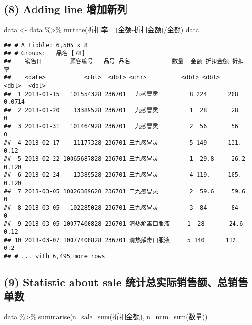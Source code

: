 \documentclass[
]{article}
\newenvironment{Shaded}{\begin{snugshade}}{\end{snugshade}}
\newcommand{\AttributeTok}[1]{\textcolor[rgb]{0.77,0.63,0.00}{#1}}
\newcommand{\FunctionTok}[1]{\textcolor[rgb]{0.00,0.00,0.00}{#1}}
\newcommand{\NormalTok}[1]{#1}
\newcommand{\OtherTok}[1]{\textcolor[rgb]{0.56,0.35,0.01}{#1}}
\newcommand{\SpecialCharTok}[1]{\textcolor[rgb]{0.00,0.00,0.00}{#1}}
\begin{document}
\hypertarget{adding-line-ux589eux52a0ux65b0ux5217}{%
\subsection{(8) Adding line
增加新列}\label{adding-line-ux589eux52a0ux65b0ux5217}}

\begin{Shaded}
\begin{Highlighting}[]
\NormalTok{data }\OtherTok{\textless{}{-}}\NormalTok{ data }\SpecialCharTok{\%\textgreater{}\%} \FunctionTok{mutate}\NormalTok{(折扣率}\OtherTok{=}\NormalTok{ (金额}\SpecialCharTok{{-}}\NormalTok{折扣金额)}\SpecialCharTok{/}\NormalTok{金额)}
\NormalTok{data}
\end{Highlighting}
\end{Shaded}

\begin{verbatim}
## # A tibble: 6,505 x 8
## # Groups:   品名 [78]
##    销售日        顾客编号   品号 品名            数量  金额 折扣金额 折扣率
##    <date>           <dbl>  <dbl> <chr>          <dbl> <dbl>    <dbl>  <dbl>
##  1 2018-01-15   101554328 236701 三九感冒灵         8 224      208   0.0714
##  2 2018-01-20    13389528 236701 三九感冒灵         1  28       28   0     
##  3 2018-01-31   101464928 236701 三九感冒灵         2  56       56   0     
##  4 2018-02-17    11177328 236701 三九感冒灵         5 149      131.  0.12  
##  5 2018-02-22 10065687828 236701 三九感冒灵         1  29.8     26.2 0.120 
##  6 2018-02-24    13389528 236701 三九感冒灵         4 119.     105.  0.120 
##  7 2018-03-05 10026389628 236701 三九感冒灵         2  59.6     59.6 0     
##  8 2018-03-05   102285028 236701 三九感冒灵         3  84       84   0     
##  9 2018-03-05 10077400828 236701 清热解毒口服液     1  28       24.6 0.12  
## 10 2018-03-07 10077400828 236701 清热解毒口服液     5 140      112   0.2   
## # ... with 6,495 more rows
\end{verbatim}

\hypertarget{statistic-about-sale-ux7edfux8ba1ux603bux5b9eux9645ux9500ux552eux989dux603bux9500ux552eux5355ux6570}{%
\subsection{(9) Statistic about sale
统计总实际销售额、总销售单数}\label{statistic-about-sale-ux7edfux8ba1ux603bux5b9eux9645ux9500ux552eux989dux603bux9500ux552eux5355ux6570}}

\begin{Shaded}
\begin{Highlighting}[]
\NormalTok{data }\SpecialCharTok{\%\textgreater{}\%} \FunctionTok{summarise}\NormalTok{(}\AttributeTok{n\_sale=}\FunctionTok{sum}\NormalTok{(折扣金额), }\AttributeTok{n\_num=}\FunctionTok{sum}\NormalTok{(数量))}
\end{Highlighting}
\end{Shaded}
\end{document}
